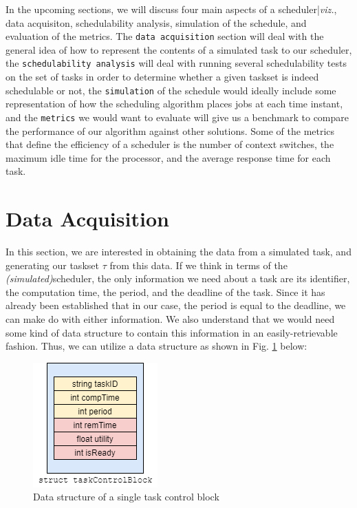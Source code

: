 In the upcoming sections, we will discuss four main aspects of a scheduler|\textit{viz.}, data acquisiton, schedulability analysis, simulation of the schedule, and evaluation of the metrics. The \texttt{data acquisition} section will deal with the general idea of how to represent the contents of a simulated task to our scheduler, the \texttt{schedulability analysis} will deal with running several schedulability tests on the set of tasks in order to determine whether a given taskset is indeed schedulable or not, the \texttt{simulation} of the schedule would ideally include some representation of how the scheduling algorithm places jobs at each time instant, and the \texttt{metrics} we would want to evaluate will give us a benchmark to compare the performance of our algorithm against other solutions. Some of the metrics that define the efficiency of a scheduler is the number of context switches, the maximum idle time for the processor, and the average response time for each task.

\section{Data Acquisition}

In this section, we are interested in obtaining the data from a simulated task, and generating our taskset $\tau$ from this data. If we think in terms of the \textit{(simulated)}scheduler, the only information we need about a task are its identifier, the computation time, the period, and the deadline of the task. Since it has already been established that in our case, the period is equal to the deadline, we can make do with either information. We also understand that we would need some kind of data structure to contain this information in an easily-retrievable fashion. Thus, we can utilize a data structure as shown in Fig. \ref{fig:tcb} below:

\begin{figure}[h!]
  \centering
  \includegraphics[scale=0.5]{../imgs/single-tcb}
  \caption{Data structure of a single task control block}
  \label{fig:tcb}
\end{figure}

